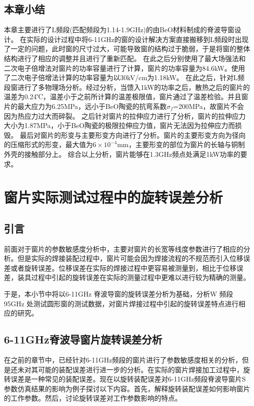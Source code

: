 \documentclass[master]{thesis-uestc}
\begin{document}
\section{本章小结}
本章主要进行了L频段(匹配频段为1.14-1.9GHz)的由BeO材料制成的脊波导窗设计。
在实际的设计过程中将6-11GHz的窗的设计解决方案直接搬移到L频段时出现了一定的问题，此时窗的尺寸过大，可能导致窗的结构过于脆弱，于是将窗的整体结构进行了相应的调整并且进行了重新匹配。
在此之后分别使用了最大场强法和二次电子倍增法对窗片的功率容量进行了计算，窗片的功率容量为84.6kW。使用了二次电子倍增法计算的功率容量为以30kV/cm为1.18kW。
在此之后，针对L频段窗进行了多物理场分析。经过分析，当馈入1kW的功率之后，散热之后的窗片的温差为0.24℃，温差小于之前所计算的温差极限值，窗片通过了温差检验。并且窗片的最大应力为6.25MPa，远小于BeO陶瓷的抗弯系数\(\sigma_f\)=200MPa，故窗片不会因为热应力过大而碎裂。
之后针对窗片的拉伸应力进行了分析，窗片的拉伸应力大小为1.87MPa，小于BeO陶瓷的极限拉伸应力值，窗片无法因为拉伸应力而损毁。
最后对窗片的形变与主要形变方向进行了分析。窗片的主要形变方向为径向的压缩形式的形变，最大值为\(6 \times 10^{-4}\)mm，主要形变的部位为窗片的长轴与铜制外壳的接触部分上。
综合以上分析，窗片能够在1.3GHz频点处满足1kW功率的要求。

\chapter{窗片实际测试过程中的旋转误差分析}
\section{引言}
前面对于窗片的参数敏感度分析中，主要对窗片的长宽等线度参数进行了相应的分析。但是实际的焊接装配过程中，窗片可能会因为焊接流程的不规范而引入位移误差或者旋转误差。位移误差在实际的焊接过程中更容易被测量到，相比于位移误差，装具过程中引起的旋转误差在实际的测量过程中更难以进行较为精确的测量。

于是，本小节中将以6-11GHz 脊波导窗的旋转误差分析为基础，分析W 频段95GHz 处测试圆形窗的测试数据，对窗片焊接过程中引起的旋转误差特点进行相应的研究。

\section{6-11GHz脊波导窗片旋转误差分析}\label{sec:6-11GHz脊波导窗片旋转误差分析}
在之前的章节中，已经针对6-11GHz频段的窗片进行了参数敏感度相关的分析，但是还未对其可能的装配误差进行进一步的分析。在实际的窗片焊接加工过程中，旋转误差是一种常见的装配误差。现在以旋转装配误差对6-11GHz频段脊波导窗片S参数仿真结果的影响为例子探讨以下内容。首先，解释旋转装配误差如何影响窗片的工作参数。然后，讨论旋转误差对工作参数影响的特点。
\end{document}
